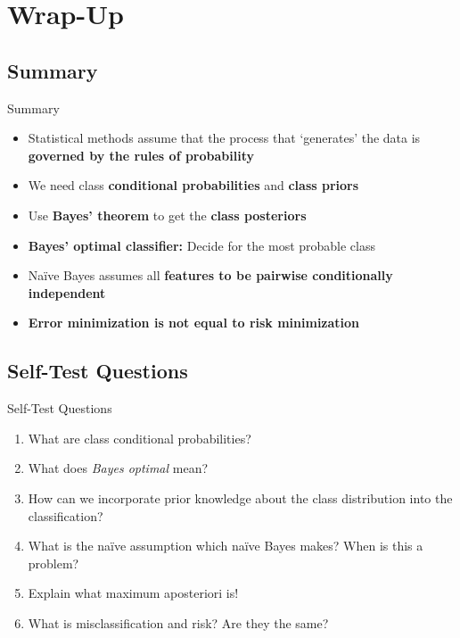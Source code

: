 \section{Wrap-Up}

\subsection{Summary}

\begin{frame}{Summary}{}
	\begin{itemize}
		\item Statistical methods assume that the process that `generates' the data is 
			\textbf{governed by the rules of probability}
		\item We need class \textbf{conditional probabilities} and \textbf{class priors}
		\item Use \textbf{Bayes' theorem} to get the \textbf{class posteriors}
		\item \textbf{Bayes' optimal classifier:} Decide for the most probable class
		\item Na\"{i}ve Bayes assumes all \textbf{features to be pairwise conditionally independent}
		\item \textbf{Error minimization is not equal to risk minimization}
	\end{itemize}
\end{frame}


\subsection{Self-Test Questions}

\begin{frame}{Self-Test Questions}{}\important
	\begin{enumerate}
		\item What are class conditional probabilities?
		\item What does \textit{Bayes optimal} mean?
		\item How can we incorporate prior knowledge about the class distribution into the classification?
		\item What is the na\"{i}ve assumption which na\"{i}ve Bayes makes? When is this a problem?
		\item Explain what maximum aposteriori is!
		\item What is misclassification and risk? Are they the same?
	\end{enumerate}
\end{frame}


